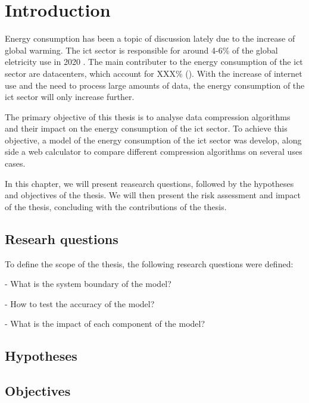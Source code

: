 

\chapter{Introduction}
\label{chapter:introduction}

\begin{introduction}

Energy consumption has been a topic of discussion lately due to the increase of global warming. The \ac{ict} sector is responsible for around 4-6\% of the global eletricity use in 2020 \citet{UK-parliament}. The main contributer to the energy consumption of the \ac{ict} sector are datacenters, which account for XXX\% (\citet{check source}). With the increase of internet use and the need to process large amounts of data, the energy consumption of the \ac{ict} sector will only increase further.

The primary objective of this thesis is to analyse data compression algorithms and their impact on the energy consumption of the \ac{ict} sector.
To achieve this objective, a model of the energy consumption of the \ac{ict} sector was develop, along side a web calculator to compare different compression algorithms on several uses cases. 

In this chapter, we will present reasearch questions, followed by the hypotheses and objectives of the thesis. We will then present the risk assessment and impact of the thesis, concluding with the contributions of the thesis. 

\end{introduction}

\section{Researh questions}

To define the scope of the thesis, the following research questions were defined:

- What is the system boundary of the model?

- How to test the accuracy of the model?

- What is the impact of each component of the model?

\section{Hypotheses}

\section{Objectives}

